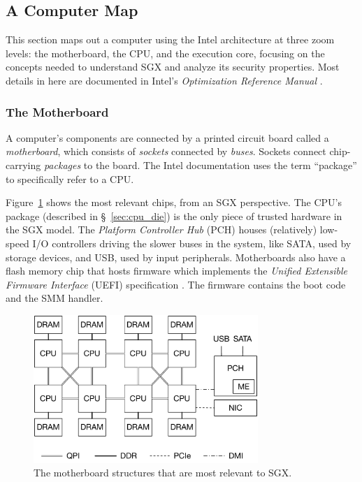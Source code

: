 \subsection{A Computer Map}
\label{sec:computer_map}

This section maps out a computer using the Intel architecture at three zoom
levels: the motherboard, the CPU, and the execution core, focusing on the
concepts needed to understand SGX and analyze its security properties. Most
details in here are documented in Intel's
\textit{Optimization Reference Manual} \cite{intel2014optimization}.


\subsubsection{The Motherboard}
\label{sec:motherboard}

A computer's components are connected by a printed circuit board called a
\textit{motherboard}, which consists of \textit{sockets} connected by
\textit{buses}. Sockets connect chip-carrying \textit{packages} to the board.
The Intel documentation uses the term ``package'' to specifically refer to a
CPU.

Figure~\ref{fig:motherboard} shows the most relevant chips, from an SGX
perspective. The CPU's package (described in \S~\ref{sec:cpu_die}) is the only
piece of trusted hardware in the SGX model. The \textit{Platform Controller
Hub} (PCH) houses (relatively) low-speed I/O controllers driving the slower
buses in the system, like SATA, used by storage devices, and USB, used by
input peripherals.  Motherboards also have a flash memory chip that hosts
firmware which implements the \textit{Unified Extensible Firmware Interface}
(UEFI) specification \cite{forum2015uefi}. The firmware contains the boot code
and the SMM handler.

\begin{figure}[hbt]
  \centering
  \includegraphics[width=85mm]{figures/motherboard.pdf}
  \caption{
    The motherboard structures that are most relevant to SGX.
  }
  \label{fig:motherboard}
\end{figure}

